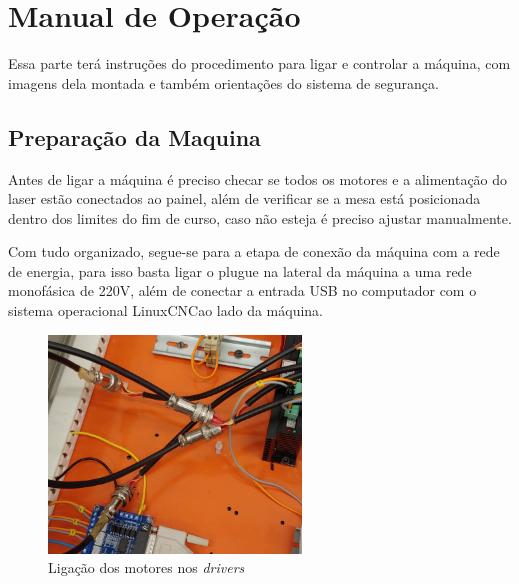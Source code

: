 \documentclass[
	article,			%
	11pt,				%
	oneside,			%
	a4paper,			%
	section=TITLE,		%
	english,			%
	brazil,				%
	sumario=tradicional
	]{abntex2}
\DeclareRobustCommand{\makered}{\color{red}}
\newcommand{\T}{{\makered TODO}~}
\newcommand{\LCNC}{LinuxCNC}
\begin{document}


\section{Manual de Operação}

Essa parte terá instruções do procedimento para ligar e controlar a máquina, com imagens dela montada e também orientações do sistema de segurança.

\subsection{Preparação da Maquina}

Antes de ligar a máquina é preciso checar se todos os motores e a alimentação do laser estão conectados ao painel, além de verificar se a mesa está posicionada dentro dos limites do fim de curso, caso não esteja é preciso ajustar manualmente. 

Com tudo organizado, segue-se para a etapa de conexão da máquina com a rede de energia, para isso basta ligar o plugue na lateral da máquina a uma rede monofásica de 220V, além de conectar a entrada USB no computador com o sistema operacional \LCNC ao lado da máquina. %

\begin{figure}[H]
    \centering
    \includegraphics[width=0.6\textwidth]{img/conec drivers.png}
    \caption{Ligação dos motores nos \textit{drivers}}
    \label{fig:conecdrimot}
\end{figure}
\end{document}

